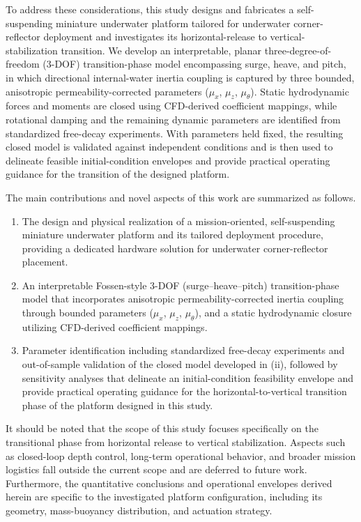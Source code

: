 To address these considerations, this study designs and fabricates a self-suspending miniature underwater platform tailored for underwater corner-reflector deployment and investigates its horizontal-release to vertical-stabilization transition. We develop an interpretable, planar three-degree-of-freedom (3-DOF) transition-phase model encompassing surge, heave, and pitch, in which directional internal-water inertia coupling is captured by three bounded, anisotropic permeability-corrected parameters ($\mu_x$, $\mu_z$, $\mu_\theta$). Static hydrodynamic forces and moments are closed using CFD-derived coefficient mappings, while rotational damping and the remaining dynamic parameters are identified from standardized free-decay experiments. With parameters held fixed, the resulting closed model is validated against independent conditions and is then used to delineate feasible initial-condition envelopes and provide practical operating guidance for the transition of the designed platform.

The main contributions and novel aspects of this work are summarized as follows.
{\renewcommand{\labelenumi}{(\roman{enumi})}
\begin{enumerate}
\item The design and physical realization of a mission-oriented, self-suspending miniature underwater platform and its tailored deployment procedure, providing a dedicated hardware solution for underwater corner-reflector placement.
\item An interpretable Fossen-style 3-DOF (surge--heave--pitch) transition-phase model that incorporates anisotropic permeability-corrected inertia coupling through bounded parameters ($\mu_x$, $\mu_z$, $\mu_\theta$), and a static hydrodynamic closure utilizing CFD-derived coefficient mappings.
\item Parameter identification including standardized free-decay experiments and out-of-sample validation of the closed model developed in (ii), followed by sensitivity analyses that delineate an initial-condition feasibility envelope and provide practical operating guidance for the horizontal-to-vertical transition phase of the platform designed in this study.
\end{enumerate}}

It should be noted that the scope of this study focuses specifically on the transitional phase from horizontal release to vertical stabilization. Aspects such as closed-loop depth control, long-term operational behavior, and broader mission logistics fall outside the current scope and are deferred to future work. Furthermore, the quantitative conclusions and operational envelopes derived herein are specific to the investigated platform configuration, including its geometry, mass-buoyancy distribution, and actuation strategy.

